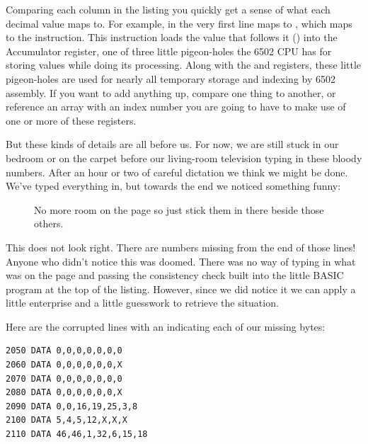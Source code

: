 Comparing each column in the listing you quickly get a sense of what each decimal value maps to. For example, in
the very first line
 maps to , which maps to the  instruction. This instruction loads the value
that follows it () into the Accumulator register, one of three little pigeon-holes the 6502 CPU
has for storing values while doing its processing. Along with the  and  registers, these little
pigeon-holes are used for nearly all temporary storage and indexing by 6502 assembly. If you want to add anything up,
compare one thing to another, or reference an array with an index number you are going to have to make use of one
or more of these registers.

But these kinds of details are all before us. For now, we are still stuck in our bedroom or on the carpet before
our living-room television typing in these bloody numbers. After an hour or two of careful dictation we think
we might be done. We've typed everything in, but towards the end we noticed something funny:

\begin{figure}[H]
    \centering
    \begin{adjustbox}{width=7cm,center}
    \end{adjustbox}
  \caption{No more room on the page so just stick them in there beside those others.}
\end{figure}

This does not look right. There are numbers missing from the end of those lines! Anyone who didn't notice
this was doomed. There was no way of typing in what was on the page and passing the consistency check
built into the little BASIC program at the top of the listing. However, since we did notice it we can apply
a little enterprise and a little guesswork to retrieve the situation.

Here are the corrupted lines with an  indicating each of our missing bytes:

\lstset{style=C64BasicStyle}
\begin{lstlisting}[escapechar=\%]
2050 DATA 0,0,0,0,0,0,0 
2060 DATA 0,0,0,0,0,0,X
2070 DATA 0,0,0,0,0,0,0 
2080 DATA 0,0,0,0,0,0,X
2090 DATA 0,0,16,19,25,3,8 
2100 DATA 5,4,5,12,X,X,X
2110 DATA 46,46,1,32,6,15,18
\end{lstlisting}

